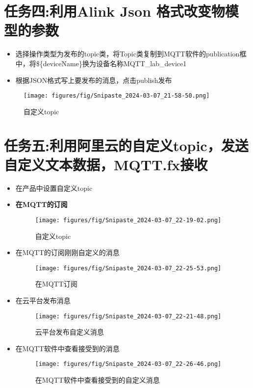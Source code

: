 \documentclass[12pt,hyperref,a4paper,UTF8]{ctexart}
\begin{document}
\section{任务四:利用Alink Json 格式改变物模型的参数}
\begin{itemize}
    \item 选择操作类型为发布的topic类，将Topic类复制到MQTT软件的publication框中，将\$\{deviceName\}换为设备名称MQTT\_lab\_device1
    \item 根据JSON格式写上要发布的消息，点击publish发布
\end{itemize}
\begin{figure}[H]
    \centering
    \texttt{[image: figures/fig/Snipaste\_2024-03-07\_21-58-50.png]}
    \caption{自定义topic}
    \label{fig:enter-label}
\end{figure}

\section{任务五:利用阿里云的自定义topic，发送自定义文本数据，MQTT.fx接收}
\begin{itemize}
    \item 在产品中设置自定义topic
    \item \bf{在MQTT的订阅}
    \begin{figure}[H]
        \centering
        \texttt{[image: figures/fig/Snipaste\_2024-03-07\_22-19-02.png]}
        \caption{自定义topic}
        \label{fig:enter-label}
    \end{figure}

    \item 在MQTT的订阅刚刚自定义的消息
    \begin{figure}[H]
        \centering
        \texttt{[image: figures/fig/Snipaste\_2024-03-07\_22-25-53.png]}
        \caption{在MQTT订阅}
        \label{fig:enter-label}
    \end{figure}
    
    \item 在云平台发布消息
    \begin{figure}[H]
        \centering
        \texttt{[image: figures/fig/Snipaste\_2024-03-07\_22-21-48.png]}
        \caption{云平台发布自定义消息}
        \label{fig:enter-label}
    \end{figure}
    \item 在MQTT软件中查看接受到的消息
    \begin{figure}[H]
        \centering
        \texttt{[image: figures/fig/Snipaste\_2024-03-07\_22-26-46.png]}
        \caption{在MQTT软件中查看接受到的自定义消息}
        \label{fig:enter-label}
    \end{figure}

\end{itemize}

\end{document}

